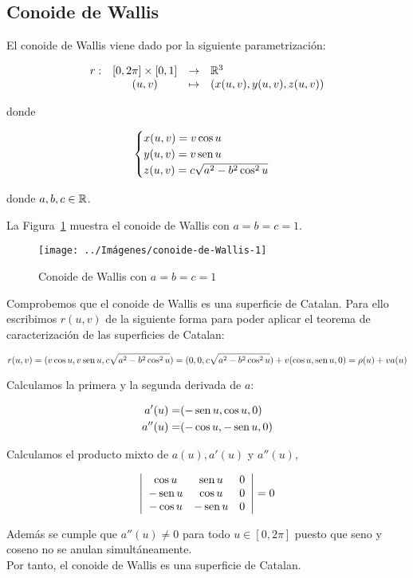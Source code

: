 \documentclass[10pt,a4paper]{article}
\begin{document}
\subsection{Conoide de Wallis}

\begin{defi}
El conoide de Wallis viene dado por la siguiente parametrización:

$$\begin{array}{rcll}
r : & [0, 2\pi] \times [0,1] & \to & \mathbb{R}^3\\
& (u,v) & \mapsto & (x(u,v),y(u,v),z(u,v))
\end{array}$$

donde 

$$ \begin{cases}
x(u,v) = v \cos u \\
y(u,v) = v \mathop{\mbox{\normalfont sen}}\nolimits u \\
z(u,v) = c \sqrt{a^2 - b^2 \cos^2 u}
\end{cases} $$

donde $a, b, c \in \mathbb{R}$.
\end{defi}

La Figura~\ref{fig:conoide-de-Wallis-1} muestra el conoide de Wallis con $a = b = c = 1$.

\begin{figure}[htbp]
	\centering
	\texttt{[image: ../Imágenes/conoide-de-Wallis-1]}
	\caption{Conoide de Wallis con $a=b=c=1$}
	\label{fig:conoide-de-Wallis-1}
\end{figure}

\begin{ejemplo}
Comprobemos que el conoide de Wallis es una superficie de Catalan. Para ello escribimos $r(u,v)$ de la siguiente forma para poder aplicar el teorema de caracterización de las superficies de Catalan:

$$ r(u,v) = (v\cos u, v\mathop{\mbox{\normalfont sen}}\nolimits u, c\sqrt{a^2 - b^2 \cos^2 u}) = (0,0,c\sqrt{a^2 - b^2 \cos^2 u}) + v(\cos u, \mathop{\mbox{\normalfont sen}}\nolimits u, 0) = \rho(u) + v a(u) $$

Calculamos la primera y la segunda derivada de $a$:

\begin{eqnarray*}
a'(u)  = &(-\mathop{\mbox{\normalfont sen}}\nolimits u, \cos u, 0)\\
a''(u) = & (-\cos u, -\mathop{\mbox{\normalfont sen}}\nolimits u, 0)
\end{eqnarray*}

Calculamos el producto mixto de $a(u), a'(u)$ y $a''(u)$,

$$ \left| \begin{array}{ccc}
\cos u & \mathop{\mbox{\normalfont sen}}\nolimits u & 0 \\
-\mathop{\mbox{\normalfont sen}}\nolimits u & \cos u & 0 \\
-\cos u & -\mathop{\mbox{\normalfont sen}}\nolimits u & 0
\end{array} \right| = 0 $$

Además se cumple que $a''(u) \neq 0$ para todo $u \in [0, 2\pi]$ puesto que seno y coseno no se anulan simultáneamente.\\

Por tanto, el conoide de Wallis es una superficie de Catalan.

\end{ejemplo}
\end{document}
